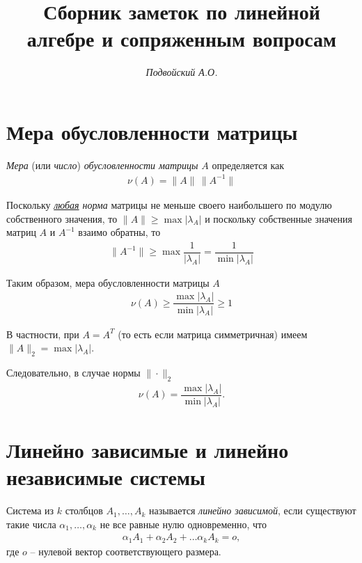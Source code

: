 \documentclass[%
	11pt,
	a4paper,
	utf8,
		]{article}
\begin{document}
\title{Сборник заметок по линейной алгебре и сопряженным вопросам}

\author{\itshape Подвойский А.О.}

\date{}
\maketitle

\thispagestyle{fancy}




\tableofcontents

\section{Мера обусловленности матрицы}

\emph{Мера} (или \emph{число}) \emph{обусловленности матрицы} $ A $ определяется как \cite[]{bahvalov:num_methods}
\begin{align*}
	\nu(A) = \| A \| \, \| A^{-1} \|
\end{align*}
 
Поскольку \emph{\underline{любая} норма} матрицы не меньше своего наибольшего по модулю собственного значения, то $ \| A \| \geqslant \max | \lambda_A | $ и поскольку собственные значения матриц $ A $ и $ A^{-1} $ взаимо обратны, то
\begin{align*}
	\| A^{-1} \| \geqslant \max \dfrac{1}{ | \lambda_A | } = \dfrac{1}{ \min | \lambda_A | }
\end{align*}

Таким образом, мера обусловленности матрицы $ A $
\begin{align*}
	\boxed{\nu(A) \geqslant \dfrac{\max | \lambda_A |}{ \min | \lambda_A | } \geqslant 1}
\end{align*}

В частности, при $ A = A^T $ (то есть если матрица симметричная) имеем $ \| A \|_2 = \max | \lambda_A | $.

Следовательно, в случае нормы $ \| \cdot \|_2 $
\begin{align*}
	\nu(A) = \dfrac{ \max | \lambda_A | }{ \min | \lambda_A | }.
\end{align*}


\section{Линейно зависимые и линейно независимые системы}

Система из $ k $ столбцов $ A_1, \ldots, A_k $ называется \emph{линейно зависимой}, если существуют такие числа $ \alpha_1, \ldots, \alpha_k $ не все равные нулю одновременно, что \cite[]{bortakovskiy:2005}
\begin{align*}
	\alpha_1 A_1 + \alpha_2 A_2 + \ldots \alpha_k A_k = o,
\end{align*}
где $ o $ -- нулевой вектор соответствующего размера.
\end{document}

